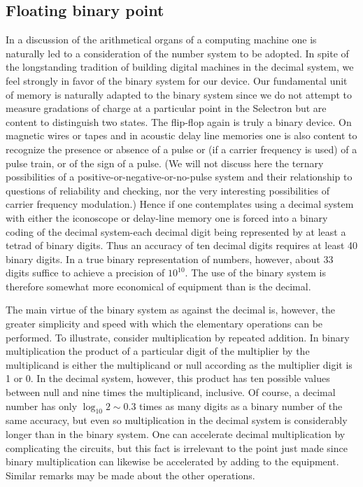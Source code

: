 \documentclass[12pt]{amsart}
\begin{document}
\subsection{Floating binary point}
In a discussion of the arithmetical organs of a computing machine one is naturally led to a consideration of the number system to be adopted. In spite of the longstanding tradition of building digital machines in the decimal system, we feel strongly in favor of the binary system for our device. Our fundamental unit of memory is naturally adapted to the binary system since we do not attempt to measure gradations of charge at a particular point in the Selectron but are content to distinguish two states. The flip-flop again is truly a binary device. On magnetic wires or tapes and in acoustic delay line memories one is also content to recognize the presence or absence of a pulse or (if a carrier frequency is used) of a pulse train, or of the sign of a pulse. (We will not discuss here the ternary possibilities of a positive-or-negative-or-no-pulse system and their relationship to questions of reliability and checking, nor the very interesting possibilities of carrier frequency modulation.) Hence if one contemplates using a decimal system with either the iconoscope or delay-line memory one is forced into a binary coding of the decimal system-each decimal digit being represented by at least a tetrad of binary digits. Thus an accuracy of ten decimal digits requires at least 40 binary digits. In a true binary representation of numbers, however, about 33 digits suffice to achieve a precision of $10^{10}$. The use of the binary system is therefore somewhat more economical of equipment than is the decimal.

The main virtue of the binary system as against the decimal is, however, the greater simplicity and speed with which the elementary operations can be performed. To illustrate, consider multiplication by repeated addition. In binary multiplication the product of a particular digit of the multiplier by the multiplicand is either the multiplicand or null according as the multiplier digit is 1 or 0. In the decimal system, however, this product has ten possible values between null and nine times the multiplicand, inclusive. Of course, a decimal number has only $\log_{10}2 \sim 0.3$ times as many digits as a binary number of the same accuracy, but even so multiplication in the decimal system is considerably longer than in the binary system. One can accelerate decimal multiplication by complicating the circuits, but this fact is irrelevant to the point just made since binary multiplication can likewise be accelerated by adding to the equipment. Similar remarks may be made about the other operations.
\end{document}
